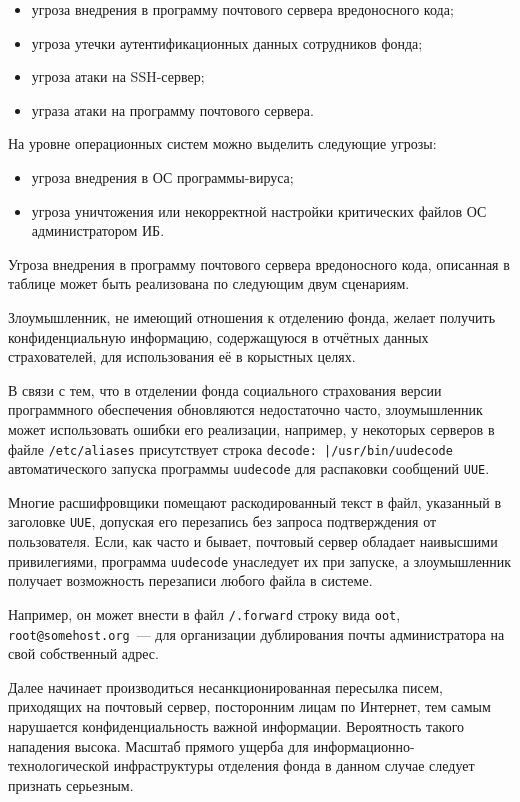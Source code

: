 \begin{itemize}
\item угроза внедрения в программу почтового сервера вредоносного кода;
\item угроза утечки аутентификационных данных сотрудников фонда;
\item угроза атаки на SSH-сервер;
\item уграза атаки на программу почтового сервера.
\end{itemize}

\point На уровне операционных систем можно выделить следующие угрозы:

\begin{itemize}
\item угроза внедрения в ОС программы-вируса;
\item угроза уничтожения или некорректной настройки критических файлов
  ОС администратором ИБ.
\end{itemize}

\point Угроза внедрения в программу почтового сервера вредоносного
кода, описанная в таблице может быть реализована по следующим двум
сценариям.

\point Злоумышленник, не имеющий отношения к отделению фонда, желает
получить конфиденциальную информацию, содержащуюся в отчётных данных
страхователей, для использования её в корыстных целях.

В связи с тем, что в отделении фонда социального страхования версии
программного обеспечения обновляются недостаточно часто, злоумышленник
может использовать ошибки его реализации, например, у некоторых
серверов в файле \texttt{/etc/aliases} присутствует строка
\texttt{decode: |/usr/bin/uudecode} автоматического запуска программы
\texttt{uudecode} для распаковки сообщений \texttt{UUE}.

Многие расшифровщики помещают раскодированный текст в файл, указанный
в заголовке \texttt{UUE}, допуская его перезапись без запроса
подтверждения от пользователя. Если, как часто и бывает, почтовый
сервер обладает наивысшими привилегиями, программа \texttt{uudecode}
унаследует их при запуске, а злоумышленник получает возможность
перезаписи любого файла в системе.

Например, он может внести в файл \texttt{/.forward} строку вида
\texttt{oot}, \texttt{root@somehost.org}~--- для организации
дублирования почты администратора на свой собственный адрес.

Далее начинает производиться несанкционированная пересылка писем,
приходящих на почтовый сервер, посторонним лицам по Интернет, тем
самым нарушается конфиденциальность важной информации. Вероятность
такого нападения высока. Масштаб прямого ущерба для
информационно-технологической инфраструктуры отделения фонда в данном
случае следует признать серьезным.

